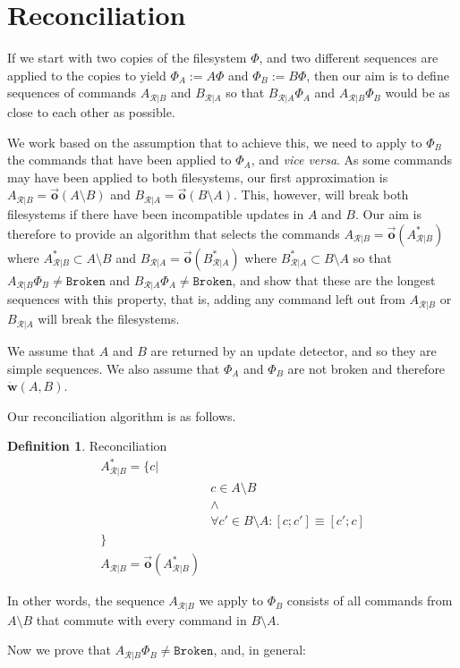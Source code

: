\documentclass[12pt]{article}
\newcommand{\fsbroken}{\mathtt{Broken}} %
\newcommand{\FS}{\Phi} %
\newcommand{\works}[1]{\dot{\mathbf{w}}({#1})}
\newcommand{\ordered}[1]{\vec{\mathbf{o}}({#1})}
\newcommand{\recchar}[3]{{#1}^{#3}_{\mathcal{R}|{#2}}}
\newcommand{\reca}{\recchar{A}{B}{}} %
\newcommand{\recb}{\recchar{B}{A}{}}
\newcommand{\recaset}{\recchar{A}{B}{*}}
\newcommand{\recbset}{\recchar{B}{A}{*}}
\theoremstyle{definition}
\newtheorem{mydef}{Definition}
\begin{document}
\section{Reconciliation}

If we start with two copies of the filesystem $\FS$,
and two different sequences are applied to the copies to yield $\FS_A:=A\FS$
and $\FS_B:=B\FS$, then our aim is to define sequences of commands $\reca$ and $\recb$
so that $\recb\FS_A$ and $\reca\FS_B$ would be as close to each other as possible.

We work based on the assumption that to achieve this, we need
to apply to $\FS_B$ the commands that have been applied to $\FS_A$, and \emph{vice versa}.
As some commands may have been applied to both filesystems, our first approximation
is $\reca = \ordered{A\setminus B}$ and $\recb = \ordered{B\setminus A}$.
This, however, will break both filesystems if there have been incompatible updates
in $A$ and $B$. 
Our aim is therefore to provide an algorithm that selects the commands 
$\reca = \ordered{\recaset}$  where $\recaset \subset A\setminus B$
and $\recb = \ordered{\recbset}$ where $\recbset \subset B\setminus A$ 
so that $\reca\FS_B\neq\fsbroken$ and $\recb\FS_A\neq\fsbroken$,
and show that these are the longest sequences with this property, that is,
adding any command left out from $\reca$ or $\recb$ will break the filesystems.

We assume that $A$ and $B$ are returned by an update detector,
and so they are simple sequences.
We also assume that $\FS_A$ and $\FS_B$ are not broken and therefore $\works{A,B}$.

Our reconciliation algorithm is as follows.

\begin{mydef}{Reconciliation}\label{def:reconciliation}
\begin{align*}
\recaset = \{c| & \\
& c\in A\setminus B \\
& \wedge \\
& \forall c'\in B\setminus A: [c;c']\equiv[c';c]\\
\} & \\
\reca = \ordered{\recaset}&
\end{align*}

In other words, the sequence $\reca$ we apply to $\FS_B$ consists of all commands from $A\setminus B$
that commute with every command in $B\setminus A$.
\end{mydef}

Now we prove that $\reca\FS_B\neq\fsbroken$, and, in general:
\end{document}
